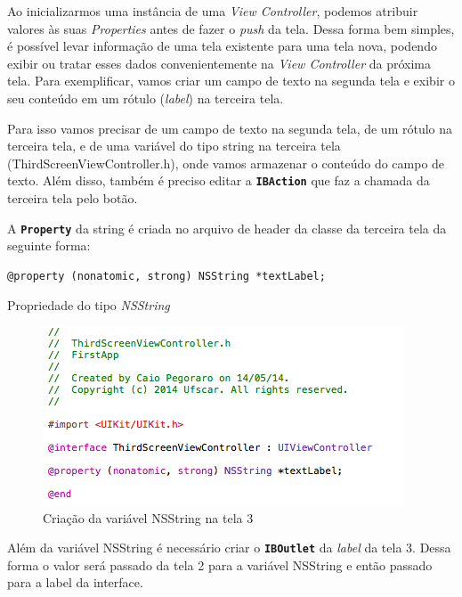 \documentclass[a4paper,12pt,brazil,doubleside]{book}
\begin{document}
\begin{singlespace}
Ao inicializarmos uma instância de uma \emph{View Controller}, podemos atribuir valores às suas \emph{Properties} antes de fazer o \emph{push} da tela. Dessa forma bem simples, é possível levar informação de uma tela existente para uma tela nova, podendo exibir ou tratar esses dados convenientemente na \emph{View Controller} da próxima tela. Para exemplificar, vamos criar um campo de texto na segunda tela e exibir o seu conteúdo em um rótulo (\emph{label}) na terceira tela.

Para isso vamos precisar de um campo de texto na segunda tela, de um rótulo na terceira tela, e de uma variável do tipo string na terceira tela (ThirdScreenViewController.h), onde vamos armazenar o conteúdo do campo de texto. Além disso, também é preciso editar a \texttt{\textbf{IBAction}} que faz a chamada da terceira tela pelo botão.

A \texttt{\textbf{Property}} da string é criada no arquivo de header da classe da terceira tela da seguinte forma:

\begin{listing}[H]
\begin{verbatim}
@property (nonatomic, strong) NSString *textLabel;
\end{verbatim}
\caption{Propriedade do tipo \emph{NSString}}
\end{listing}

\begin{figure}[H]
  \centering
  \includegraphics[width=.75\textwidth]{figuras/3/tela_novo_projeto_41.png}
  \caption{Criação da variável NSString na tela 3}
  \label{fig:a}
\end{figure} 

\bigskip
\bigskip


Além da variável NSString é necessário criar o \texttt{\textbf{IBOutlet}} da \emph{label} da tela 3. Dessa forma o valor será passado da tela 2 para a variável NSString e então passado para a label da interface.


\end{singlespace}
\end{document}
